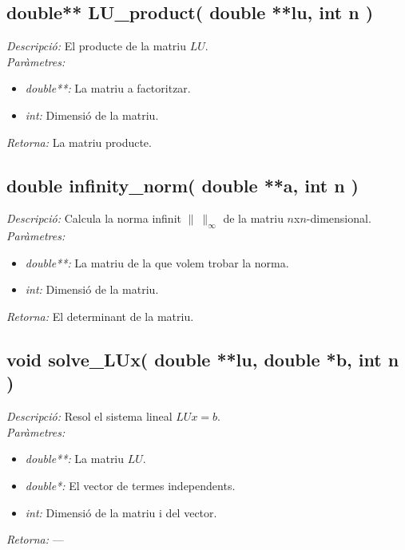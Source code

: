 \documentclass[a4paper,10pt, notitlepage]{article}
\begin{document}
\subsection{double** LU\_product( double **lu, int n )}
\textit{Descripció: }
  El producte de la matriu $LU$.
\\\textit{Paràmetres: }\begin{itemize}[label={--}]
  \item \textit{double**: } La matriu a factoritzar.
  \item \textit{int: } Dimensió de la matriu.
\end{itemize}
\textit{Retorna: } La matriu producte.



\subsection{double infinity\_norm( double **a, int n )}
\textit{Descripció: }
  Calcula la norma infinit $\|\ \|_\infty$ de la matriu $n$x$n$-dimensional.
\\\textit{Paràmetres: }\begin{itemize}[label={--}]
  \item \textit{double**: } La matriu de la que volem trobar la norma.
  \item \textit{int: } Dimensió de la matriu.
\end{itemize}
\textit{Retorna: } El determinant de la matriu.



\subsection{void solve\_LUx( double **lu, double *b, int n )}
\textit{Descripció: }
  Resol el sistema lineal $LUx = b$.
\\\textit{Paràmetres: }\begin{itemize}[label={--}]
  \item \textit{double**: } La matriu $LU$.
  \item \textit{double*: } El vector de termes independents.
  \item \textit{int: } Dimensió de la matriu i del vector.
\end{itemize}
\textit{Retorna: } ---
\end{document}
